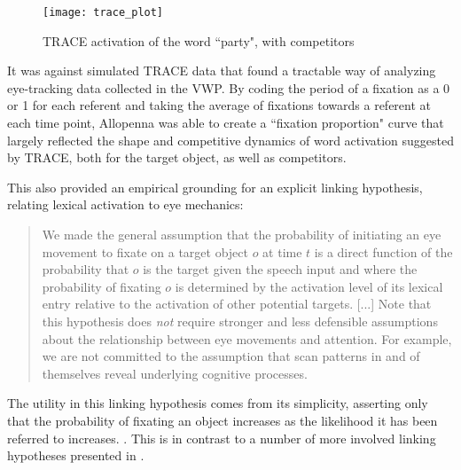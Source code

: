 \begin{figure}[H]
\centering
\texttt{[image: trace\_plot]}
\caption{TRACE activation of the word ``party", with competitors}
\label{fig:trace_plot}
\end{figure}



It was against simulated TRACE data that \citet{allopenna1998tracking} found a tractable way of analyzing eye-tracking data collected in the VWP.  By coding the period of a fixation as a 0 or 1 for each referent and taking the average of fixations towards a referent at each time point, Allopenna was able to create a ``fixation proportion" curve that largely reflected the shape and competitive dynamics of word activation suggested by TRACE, both for the target object, as well as competitors. 

This also provided an empirical grounding for an explicit linking hypothesis, relating lexical activation to eye mechanics:

\begin{quote}
We made the general assumption that the probability of initiating an eye movement to fixate on a target object $o$ at time $t$ is a direct function of the probability that $o$ is the target given the speech input and where the probability of fixating $o$ is determined by the activation level of its lexical entry relative to the activation of other potential targets. [...] Note that this hypothesis does \emph{not} require stronger and less defensible assumptions about the relationship between eye  movements and attention. For example, we are not committed to the assumption that scan patterns in and of themselves reveal underlying cognitive processes.
\end{quote}

The utility in this linking hypothesis comes from its simplicity, asserting only that the probability of fixating an object increases as the likelihood it has been referred to increases. . This is in contrast to a number of more involved linking hypotheses presented in \citep{Magnuson2019}.


